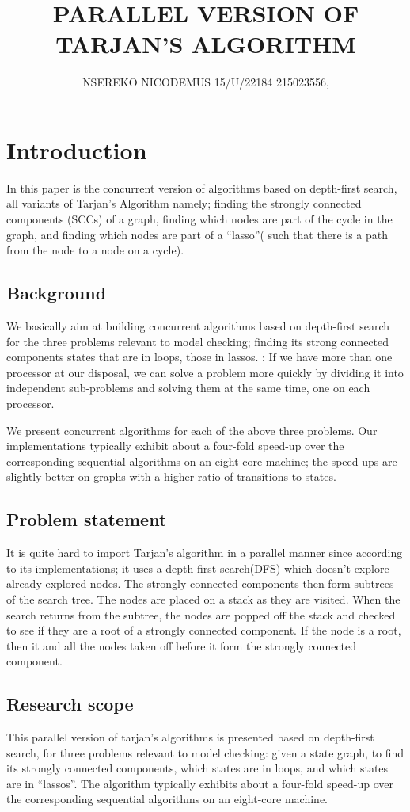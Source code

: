 \documentclass{article}
\title{PARALLEL VERSION OF TARJAN'S ALGORITHM}
\author{NSEREKO NICODEMUS   15/U/22184     215023556,    }
\begin{document}
\maketitle
\section{Introduction}{In this paper is the concurrent version of algorithms based on depth-first search, all variants of Tarjan’s Algorithm namely; finding the strongly connected components (SCCs) of a graph, finding which nodes are part of the cycle in the graph, and finding which nodes are part of a “lasso”( such that there is a path from the node to a node on a cycle).}
\subsection{Background}{We basically aim at building concurrent algorithms based on depth-first search \cite{ref2} for the three problems relevant to model checking; finding its strong connected components states that are in loops, those in lassos. : If we have more than one processor at our disposal, we can solve a problem more quickly by dividing it into independent sub-problems and solving them at the same time, one on each processor.}

{We present concurrent algorithms for each of the above three problems. Our implementations typically exhibit about a four-fold speed-up over the corresponding sequential algorithms on an eight-core machine; the speed-ups are slightly better on graphs with a higher ratio of transitions to states. }

\subsection{Problem statement}{It is quite hard to import Tarjan’s algorithm in a parallel manner since according to its implementations; it uses a depth first search(DFS) which doesn’t explore already explored nodes. The strongly connected components then form subtrees of the search tree. The nodes are placed on a stack as they are visited. When the search returns from the subtree, the nodes are popped off the stack and checked to see if they are a root of a strongly connected component. If the node is a root, then it and all the nodes taken off before it form the strongly connected component.}

\subsection{Research scope}{This parallel version of tarjan’s algorithms is presented based on depth-first search, for three problems relevant to model checking: given a state graph, to find its strongly connected components, which states are in loops, and which states are in “lassos”. The algorithm typically exhibits about a four-fold speed-up over the corresponding sequential algorithms on an eight-core machine\cite{ref3}.}



\end{document}
